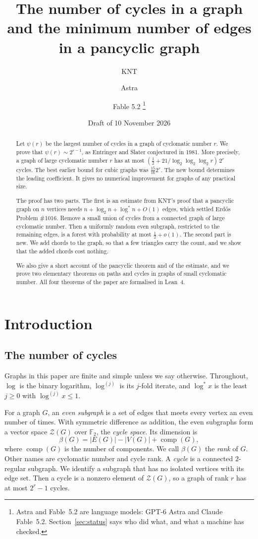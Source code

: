 \documentclass[11pt]{article}
\title{The number of cycles in a graph\\ and the minimum number of edges in a pancyclic graph}
\author{KNT \and Astra \and Fable 5.2%
\thanks{Astra and Fable~5.2 are language models: GPT-6 Astra and Claude Fable~5.2.
Section~\ref{sec:status} says who did what, and what a machine has checked.}}
\date{Draft of 10 November 2026}
\theoremstyle{definition}
\theoremstyle{remark}
\newcommand{\Z}{\mathcal{Z}}
\newcommand{\comp}{\operatorname{comp}}
\newcommand{\lgs}{\log^{*}}
\newcommand{\lgk}[1]{\log^{(#1)}}
\newcommand{\half}{\tfrac12}
\numberwithin{equation}{section}
\begin{document}
\maketitle

\begin{abstract}
Let $\psi(r)$ be the largest number of cycles in a graph of cyclomatic number $r$. We prove that
$\psi(r)\sim2^{r-1}$, as Entringer and Slater conjectured in 1981. More precisely, a graph of large
cyclomatic number $r$ has at most $(\half+21/\log_2\log_2\log_2 r)\,2^{r}$ cycles. The best earlier
bound for cubic graphs was $\frac{15}{16}2^{r}$. The new bound determines the leading coefficient.
It gives no numerical improvement for graphs of any practical size.

The proof has two parts. The first is an estimate from KNT's proof that a pancyclic graph on $n$
vertices needs $n+\log_2n+\lgs n+O(1)$ edges, which settled Erd\H{o}s Problem \#1016. Remove a small
union of cycles from a connected graph of large cyclomatic number. Then a uniformly random even
subgraph, restricted to the remaining edges, is a forest with probability at most $\half+o(1)$. The
second part is new. We add chords to the graph, so that a few triangles carry the count, and we
show that the added chords cost nothing.

We also give a short account of the pancyclic theorem and of the estimate, and we prove two
elementary theorems on paths and cycles in graphs of small cyclomatic number. All four theorems of
the paper are formalised in Lean~4.
\end{abstract}


\section{Introduction}\label{sec:intro}

\subsection{The number of cycles}

Graphs in this paper are finite and simple unless we say otherwise. Throughout, $\log$ is the
binary logarithm, $\lgk{j}$ is its $j$-fold iterate, and $\lgs x$ is the least $j\ge0$ with
$\lgk{j}x\le1$.

For a graph $G$, an \emph{even subgraph} is a set of edges that meets every vertex an even number of
times. With symmetric difference as addition, the even subgraphs form a vector space $\Z(G)$ over
$\mathbb{F}_2$, the \emph{cycle space}. Its dimension is
\[
  \beta(G)=|E(G)|-|V(G)|+\comp(G),
\]
where $\comp(G)$ is the number of components. We call $\beta(G)$ the \emph{rank} of $G$. Other names
are cyclomatic number and cycle rank. A \emph{cycle} is a connected $2$-regular subgraph. We
identify a subgraph that has no isolated vertices with its edge set. Then a cycle is a nonzero
element of $\Z(G)$, so a graph of rank $r$ has at most $2^{r}-1$ cycles.
\end{document}

